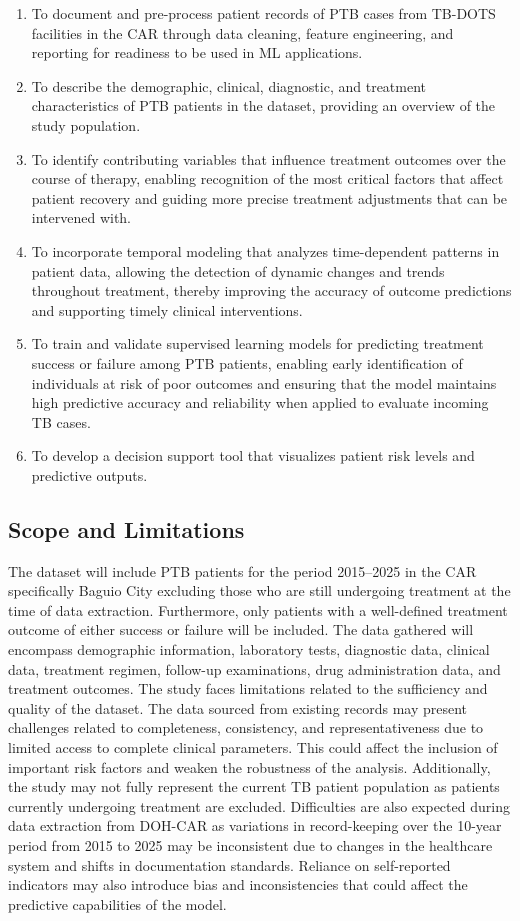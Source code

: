 \documentclass[12pt]{article}
\begin{document}
\begin{enumerate}
    \item To document and pre-process patient records of PTB cases from TB-DOTS facilities in the CAR through data cleaning, feature engineering, and reporting for readiness to be used in ML applications.
    \item To describe the demographic, clinical, diagnostic, and treatment characteristics of PTB patients in the dataset, providing an overview of the study population.
    \item To identify contributing variables that influence treatment outcomes over the course of therapy, enabling recognition of the most critical factors that affect patient recovery and guiding more precise treatment adjustments that can be intervened with.
    \item To incorporate temporal modeling that analyzes time-dependent patterns in patient data, allowing the detection of dynamic changes and trends throughout treatment, thereby improving the accuracy of outcome predictions and supporting timely clinical interventions.
    \item To train and validate supervised learning models for predicting treatment success or failure among PTB patients, enabling early identification of individuals at risk of poor outcomes and ensuring that the model maintains high predictive accuracy and reliability when applied to evaluate incoming TB cases.
    \item To develop a decision support tool that visualizes patient risk levels and predictive outputs.
\end{enumerate}

\subsection{Scope and Limitations}

The dataset will include PTB patients for the period 2015--2025 in the CAR specifically Baguio City excluding those who are still undergoing treatment at the time of data extraction. Furthermore, only patients with a well-defined treatment outcome of either success or failure will be included. The data gathered will encompass demographic information, laboratory tests, diagnostic data, clinical data, treatment regimen, follow-up examinations, drug administration data, and treatment outcomes. The study faces limitations related to the sufficiency and quality of the dataset. The data sourced from existing records may present challenges related to completeness, consistency, and representativeness due to limited access to complete clinical parameters. This could affect the inclusion of important risk factors and weaken the robustness of the analysis. Additionally, the study may not fully represent the current TB patient population as patients currently undergoing treatment are excluded. Difficulties are also expected during data extraction from DOH-CAR as variations in record-keeping over the 10-year period from 2015 to 2025 may be inconsistent due to changes in the healthcare system and shifts in documentation standards. Reliance on self-reported indicators may also introduce bias and inconsistencies that could affect the predictive capabilities of the model.
\end{document}
